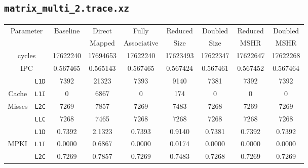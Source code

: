 \documentclass[11pt, swedish, openany]{book}
\begin{document}
\subsection{\texttt{matrix\_multi\_2.trace.xz}}
\begin{table}[H]
    \begin{tabular}{||c|c||c||c|c||c|c||c|c||}
        \hline
        \multicolumn{2}{||c||}{\multirow{2}{*}{Parameter}} & \multirow{2}{*}{Baseline} & Direct   & Fully       & Reduced  & Doubled  & Reduced  & Doubled  \\
        \multicolumn{2}{||c||}{}                           &                           & Mapped   & Associative & Size     & Size     & MSHR     & MSHR     \\
        \hline
        \multicolumn{2}{||c||}{cycles}                     & 17622240                  & 17694653 & 17622240    & 17623493 & 17622347 & 17622647 & 17622268 \\
        \multicolumn{2}{||c||}{IPC}                        & 0.567465                  & 0.565143 & 0.567465    & 0.567424 & 0.567461 & 0.567452 & 0.567464 \\
        \hline
                                            & \texttt{L1D} & 7392                      & 21323    & 7393        & 9140     & 7381     & 7392     & 7392     \\
        Cache                               & \texttt{L1I} & 0                         & 6867     & 0           & 174      & 0        & 0        & 0        \\
        Misses                              & \texttt{L2C} & 7269                      & 7857     & 7269        & 7483     & 7268     & 7269     & 7269     \\
                                            & \texttt{LLC} & 7268                      & 7465     & 7268        & 7268     & 7268     & 7268     & 7268     \\
        \hline
                                            & \texttt{L1D} & 0.7392                    & 2.1323   & 0.7393      & 0.9140   & 0.7381   & 0.7392   & 0.7392   \\
        \multirow{2}{*}{MPKI}               & \texttt{L1I} & 0.0000                    & 0.6867   & 0.0000      & 0.0174   & 0.0000   & 0.0000   & 0.0000   \\
                                            & \texttt{L2C} & 0.7269                    & 0.7857   & 0.7269      & 0.7483   & 0.7268   & 0.7269   & 0.7269   \\

\end{tabular}
\end{table}
\end{document}

